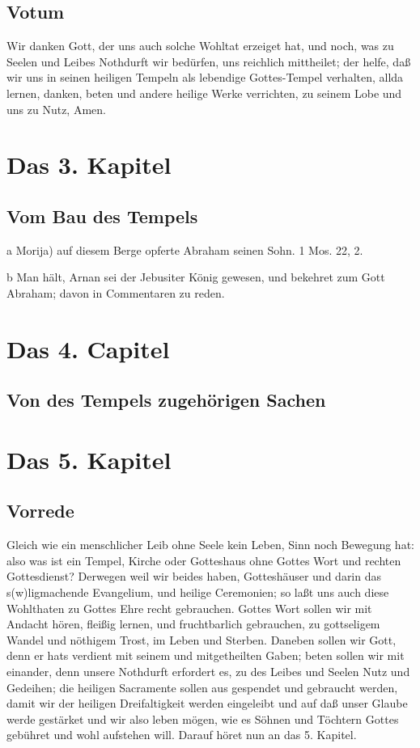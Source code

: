 \section{Votum}

Wir danken Gott, der uns auch solche Wohltat erzeiget hat, und noch, was zu Seelen und Leibes Nothdurft wir bedürfen, uns reichlich mittheilet; der helfe, daß wir uns in seinen heiligen Tempeln als lebendige Gottes-Tempel verhalten, allda lernen, danken, beten und andere heilige Werke verrichten, zu seinem Lobe und uns zu Nutz, Amen.

\chapter{Das 3. Kapitel}

\section[Vom Bau des Tempels]{Vom Bau des Tempels}

a Morija) auf diesem Berge opferte Abraham seinen Sohn. 1 Mos. 22, 2.

b Man hält, Arnan sei der Jebusiter König gewesen, und bekehret zum Gott Abraham; davon in Commentaren zu reden.

\chapter{Das 4. Capitel}

\section[Von des Tempels zugehörigen Sachen]{Von des Tempels zugehörigen Sachen}

\chapter{Das 5. Kapitel}

\section{Vorrede}

Gleich wie ein menschlicher Leib ohne Seele kein Leben, Sinn noch Bewegung hat: also was ist ein Tempel, Kirche oder Gotteshaus ohne Gottes Wort und rechten Gottesdienst? Derwegen weil wir beides haben, Gotteshäuser und darin das s(w)ligmachende Evangelium, und heilige Ceremonien; so laßt uns auch diese Wohlthaten zu Gottes Ehre recht gebrauchen. Gottes Wort sollen wir mit Andacht hören, fleißig lernen, und fruchtbarlich gebrauchen, zu gottseligem Wandel und nöthigem Trost, im Leben und Sterben. Daneben sollen wir Gott, denn er hats verdient mit seinem und mitgetheilten Gaben; beten sollen wir mit einander, denn unsere Nothdurft erfordert es, zu des Leibes und Seelen Nutz und Gedeihen; die heiligen Sacramente sollen aus gespendet und gebraucht werden, damit wir der heiligen Dreifaltigkeit werden eingeleibt und auf daß unser Glaube werde gestärket und wir also leben mögen, wie es Söhnen und Töchtern Gottes gebühret und wohl aufstehen will. Darauf höret nun an das 5. Kapitel.

